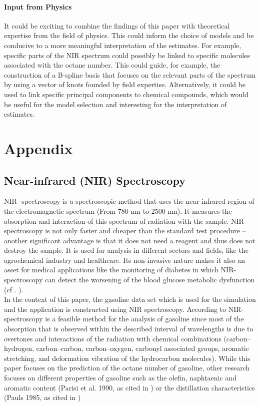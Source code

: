 \documentclass[11pt,twoside,a4paper]{article}
\begin{document}
	\paragraph{Input from Physics}
	It could be exciting to combine the findings of this paper with theoretical expertise from the field of physics. This could inform the choice of models and be conducive to a more meaningful interpretation of the estimates. For example, specific parts of the NIR spectrum could possibly be linked to specific molecules associated with the octane number. This could guide, for example, the construction of a B-spline basis that focuses on the relevant parts of the spectrum by using a vector of knots founded by field expertise. Alternatively, it could be used to link specific principal components to chemical compounds, which would be useful for the model selection and interesting for the interpretation of estimates.
	\vspace{-0.2cm}
	
	\nocite{James.2009} %
	
	\newpage
	\section{Appendix}
	
	\subsection{Near-infrared (NIR) Spectroscopy}\label{NIR}
	NIR- spectroscopy is a spectroscopic method that uses the near-infrared region of the electromagnetic spectrum (From 780 nm to 2500 nm). It measures the absorption and interaction of this spectrum of radiation with the sample. NIR-spectroscopy is not only faster and cheaper than the standard test procedure – another significant advantage is that it does not need a reagent and thus does not destroy the sample. It is used for analysis in different sectors and fields, like the agrochemical industry and healthcare. Its non-invasive nature makes it also an asset for medical applications like the monitoring of diabetes in which NIR-spectroscopy can detect the worsening of the blood glucose metabolic dysfunction (cf . \cite{FR_li_et_al_2020}). \\
	In the context of this paper, the gasoline data set which is used for the simulation and the application is constructed using NIR spectroscopy. According to \cite{Bohacs_Ovadi_Salgo1998} NIR-spectroscopy is a feasible method for the analysis of gasoline since most of the absorption that is observed within the described interval of wavelengths is due to overtones and interactions of the radiation with chemical combinations (carbon–hydrogen, carbon–carbon, carbon–oxygen, carbonyl associated groups, aromatic stretching, and deformation vibration of the hydrocarbon molecules). While this paper focuses on the prediction of the octane number of gasoline, other research focuses  on different properties of gasoline such as the olefin, naphtaenic and aromatic content (Parisi et al. 1990, as cited in \cite{Bohacs_Ovadi_Salgo1998}) or the distillation characteristics (Pauls 1985, as cited in \cite{Bohacs_Ovadi_Salgo1998})
	\vspace{0.5cm}
\end{document}
